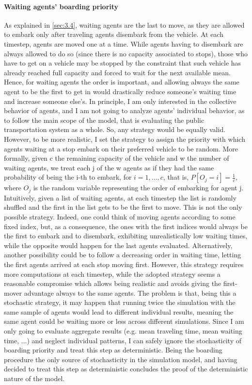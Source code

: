 \paragraph{Waiting agents' boarding priority}
As explained in \ref{sec:3.4}, waiting agents are the last to move, as they are allowed to embark only after traveling agents disembark from the vehicle. At each timestep, agents are moved one at a time. While agents having to disembark are always allowed to do so (since there is no capacity associated to stops), those who have to get on a vehicle may be stopped by the constraint that such vehicle has already reached full capacity and forced to wait for the next available mean. Hence, for waiting agents the order is important, and allowing always the same agent to be the first to get in would drastically reduce someone's waiting time and increase someone else's.
In principle, I am only interested in the collective behavior of agents, and I am not going to analyze agents' individual behavior, as to follow the main scope of the model, that is evaluating the public transportation system as a whole. So, any strategy would be equally valid. However, to be more realistic, I set the strategy to assign the priority with which agents waiting at a stop embark on their preferred vehicle to be random. More formally, given c the remaining capacity of the vehicle and w the number of waiting agents, we treat each j of the w agents as if they had the same probability of being the i-th to embark, for $i = 1, ..., c$, that is, $P[O_j = i] = \frac{1}{c}$, where $O_j$ is the random variable representing the order of embarking for agent j. Intuitively, given a list of waiting agents, at each timestep the list is randomly shuffled and the first in the list gets to be the first to move. This is not the only possible strategy. Indeed, one could think of moving agents according to some fixed index, but, as a consequence, the ones with the first indices would always be the first to embark and to disembark, exhibiting unrealistically low waiting times, while the opposite would happen for the last agents evaluated. Alternatively, another possibility could be to follow a decreasing order in waiting time, letting the first agents arrived at each stop moving first. However, this strategy requires more computations at each timestep, while the adopted strategy seems a reasonable compromise which allows being realistic and avoids giving the first-mover advantage always to the same agents. The problem is that, being this a stochastic strategy, it may happen that running twice the simulation with the same sample of agents would lead to different individual results, meaning the same agent could be waiting more or less across different simulations. Since I am only going to evaluate aggregate results (e.g. mean traveling time, mean waiting time, ...) and neglect individual patterns, I can safely ignore the stochasticity of boarding priority and treat this step as deterministic. Being the boarding procedure the only source of stochasticity in the simulation model, and having decided to treat this step as deterministic concludes the proof of the deterministic nature of the model.

